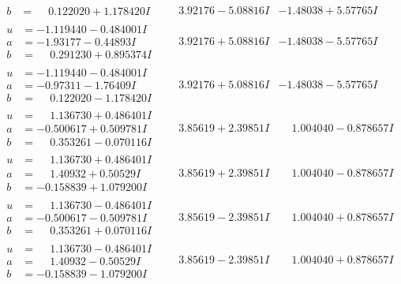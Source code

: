 \documentclass[1p]{elsarticle_modified}
\theoremstyle{definition}
\begin{document}
$$\begin{array}{c|c|c}
\begin{aligned}
b &= \phantom{-}0.122020 + 1.178420 I\end{aligned}
 & \phantom{-}3.92176 - 5.08816 I & -1.48038 + 5.57765 I \\ \hline\begin{aligned}
u &= -1.119440 - 0.484001 I \\
a &= -1.93177 - 0.44893 I \\
b &= \phantom{-}0.291230 + 0.895374 I\end{aligned}
 & \phantom{-}3.92176 + 5.08816 I & -1.48038 - 5.57765 I \\ \hline\begin{aligned}
u &= -1.119440 - 0.484001 I \\
a &= -0.97311 - 1.76409 I \\
b &= \phantom{-}0.122020 - 1.178420 I\end{aligned}
 & \phantom{-}3.92176 + 5.08816 I & -1.48038 - 5.57765 I \\ \hline\begin{aligned}
u &= \phantom{-}1.136730 + 0.486401 I \\
a &= -0.500617 + 0.509781 I \\
b &= \phantom{-}0.353261 - 0.070116 I\end{aligned}
 & \phantom{-}3.85619 + 2.39851 I & \phantom{-}1.004040 - 0.878657 I \\ \hline\begin{aligned}
u &= \phantom{-}1.136730 + 0.486401 I \\
a &= \phantom{-}1.40932 + 0.50529 I \\
b &= -0.158839 + 1.079200 I\end{aligned}
 & \phantom{-}3.85619 + 2.39851 I & \phantom{-}1.004040 - 0.878657 I \\ \hline\begin{aligned}
u &= \phantom{-}1.136730 - 0.486401 I \\
a &= -0.500617 - 0.509781 I \\
b &= \phantom{-}0.353261 + 0.070116 I\end{aligned}
 & \phantom{-}3.85619 - 2.39851 I & \phantom{-}1.004040 + 0.878657 I \\ \hline\begin{aligned}
u &= \phantom{-}1.136730 - 0.486401 I \\
a &= \phantom{-}1.40932 - 0.50529 I \\
b &= -0.158839 - 1.079200 I\end{aligned}
 & \phantom{-}3.85619 - 2.39851 I & \phantom{-}1.004040 + 0.878657 I\\

\end{array}$$
\end{document}
